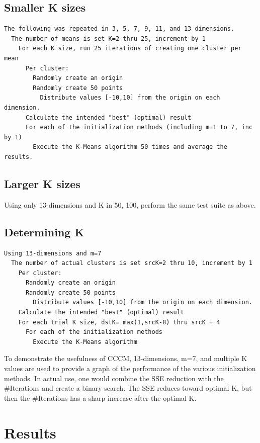 \documentclass{article}
\begin{document}
\subsection{Smaller K sizes}

\begin{verbatim}
The following was repeated in 3, 5, 7, 9, 11, and 13 dimensions.
  The number of means is set K=2 thru 25, increment by 1
    For each K size, run 25 iterations of creating one cluster per mean 
      Per cluster:
        Randomly create an origin
        Randomly create 50 points
          Distribute values [-10,10] from the origin on each dimension.
      Calculate the intended "best" (optimal) result
      For each of the initialization methods (including m=1 to 7, inc by 1)
        Execute the K-Means algorithm 50 times and average the results.
\end{verbatim}

\subsection{Larger K sizes}

Using only 13-dimensions and K in 50, 100, perform the same test suite as above.

\subsection{Determining K}

\begin{verbatim}
Using 13-dimensions and m=7
  The number of actual clusters is set srcK=2 thru 10, increment by 1
    Per cluster:
      Randomly create an origin
      Randomly create 50 points
        Distribute values [-10,10] from the origin on each dimension.
    Calculate the intended "best" (optimal) result
    For each trial K size, dstK= max(1,srcK-8) thru srcK + 4
      For each of the initialization methods
        Execute the K-Means algorithm
\end{verbatim}

To demonstrate the usefulness of CCCM, 13-dimensions, m=7, and multiple K values are used to provide a graph of the performance of the various initialization methods.  In actual use, one would combine the SSE reduction with the \#Iterations and create a binary search.  The SSE reduces toward optimal K, but then the \#Iterations has a sharp increase after the optimal K.

\section{Results}
\label{results}
\end{document}
